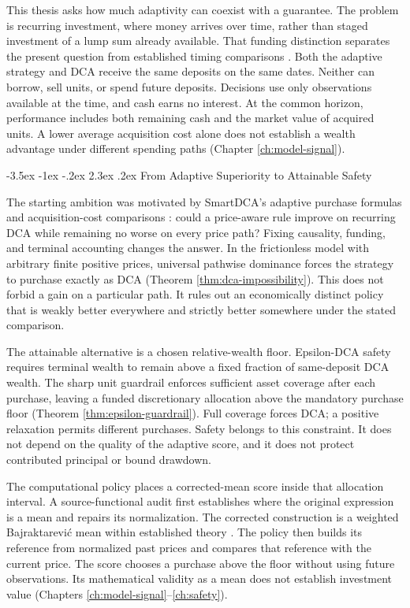 \documentclass[12pt,a4paper,oneside]{report}
\makeatletter
\renewcommand\section{\@startsection{section}{1}{\z@}%
  {-3.5ex \@plus -1ex \@minus -.2ex}%
  {2.3ex \@plus .2ex}%
  {\normalfont\fontsize{14}{17}\selectfont\bfseries}}
\makeatother
\begin{document}
This thesis asks how much adaptivity can coexist with a guarantee. The problem
is recurring investment, where money arrives over time, rather than staged
investment of a lump sum already available. That funding distinction separates
the present question from established timing comparisons
\citep{constantinides1979,finlayzorn2023}. Both the adaptive strategy and DCA
receive the same deposits on the same dates. Neither can borrow, sell units,
or spend future deposits. Decisions use only observations available at the
time, and cash earns no interest. At the common horizon, performance includes
both remaining cash and the market value of acquired units. A lower average
acquisition cost alone does not establish a wealth advantage under different
spending paths (Chapter \ref{ch:model-signal}).

\section{From Adaptive Superiority to Attainable Safety}
\label{sec:introduction-route}

The starting ambition was motivated by SmartDCA's adaptive purchase formulas
and acquisition-cost comparisons \citep{calvet2023smartdca}: could a price-aware
rule improve on recurring DCA while remaining no worse on every price path?
Fixing causality, funding, and terminal accounting changes the answer.
In the frictionless model with arbitrary finite positive prices, universal
pathwise dominance forces the strategy to purchase exactly as DCA
(Theorem \ref{thm:dca-impossibility}). This does not forbid a gain on a
particular path. It rules out an economically distinct policy that is weakly
better everywhere and strictly better somewhere under the stated comparison.

The attainable alternative is a chosen relative-wealth floor.
Epsilon-DCA safety requires terminal wealth to remain above a fixed fraction
of same-deposit DCA wealth. The sharp unit guardrail enforces sufficient asset
coverage after each purchase, leaving a funded discretionary allocation above
the mandatory purchase floor (Theorem \ref{thm:epsilon-guardrail}). Full
coverage forces DCA; a positive relaxation permits different purchases. Safety
belongs to this constraint. It does not depend on the quality of the adaptive
score, and it does not protect contributed principal or bound drawdown.

The computational policy places a corrected-mean score inside that allocation
interval. A source-functional audit first establishes where the original
expression is a mean and repairs its normalization. The corrected construction
is a weighted Bajraktarevi\'c mean within established theory
\citep{bajraktarevic1958,paleszakaria2020}. The policy then builds its reference
from normalized past prices and compares that reference with the current
price. The score chooses a purchase above the floor without using future
observations. Its mathematical validity as a mean does not establish investment
value (Chapters \ref{ch:model-signal}--\ref{ch:safety}).
\end{document}
